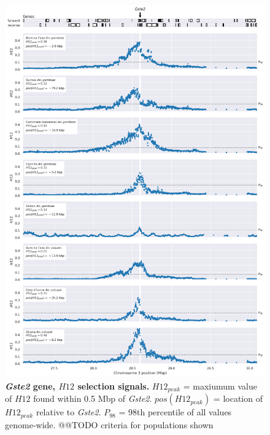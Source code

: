 \documentclass[a4paper,11pt,abstracton,hidelinks]{scrartcl}
\begin{document}
\begin{figure}[t!]
	\begin{center}
		\includegraphics*[width=1\linewidth,center]{artwork/locus_gste2_h12_pdist.png}
	\end{center}
	\caption[\textit{Gste2} gene, $H12$ selection signals]{
	\textbf{\textit{Gste2} gene, $H12$ selection signals.}
	$H12_{peak}$ = maxiumum value of $H12$ found within 0.5 Mbp of \textit{Gste2}. 
	$pos(H12_{peak})$ = location of $H12_{peak}$ relative to \textit{Gste2}.
	$P_{98}$ = 98th percentile of all values genome-wide.
	@@TODO criteria for populations shown
	} 
	\label{fig:locus_gste2_h12}
\end{figure}


%
%
\end{document}
